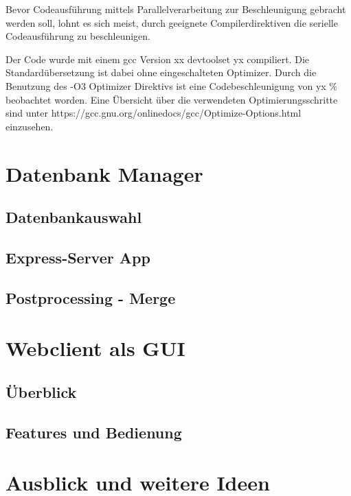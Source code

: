 \documentclass[10pt,a4paper]{report}
\begin{document}
Bevor Codeausführung mittels Parallelverarbeitung zur Beschleunigung gebracht werden soll, lohnt es sich meist, durch geeignete Compilerdirektiven die serielle Codeausführung zu beschleunigen.

Der Code wurde mit einem gcc Version xx devtoolset yx compiliert. Die Standardübersetzung ist dabei ohne eingeschalteten Optimizer. 
Durch die Benutzung des -O3 Optimizer Direktivs ist eine Codebeschleunigung von yx \% beobachtet worden. 
Eine Übersicht über die verwendeten Optimierungsschritte sind unter https://gcc.gnu.org/onlinedocs/gcc/Optimize-Options.html einzusehen.

\chapter{Datenbank Manager}
\section{Datenbankauswahl}
\section{Express-Server App}
\section{Postprocessing - Merge}

\chapter{Webclient als GUI}
\section{Überblick}
\section{Features und Bedienung}
  
\chapter{Ausblick und weitere Ideen}
\end{document}
